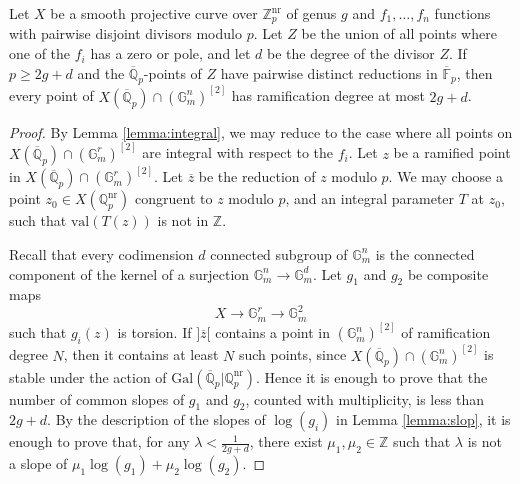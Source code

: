 \documentclass[10pt,a4paper]{amsart}
\def\Q{\mathbb Q}
\def\Z{\mathbb Z}
\newcommand{\F}{\mathbb{F}}
\newcommand{\Gal}{\mathrm{Gal}}
\newcommand{\nr}{\mathrm{nr}}
\newcommand{\val}{\mathrm{val}}
\begin{document}
\begin{proposition}\label{prop:ram}
Let $X$ be a smooth projective curve over $\Z _p ^{\nr }$ of genus $g$ and $f_1 ,\ldots ,f_n$ functions with pairwise disjoint divisors modulo $p$. Let $Z$ be the union of all points where one of the $f_i$ has a zero or pole, and let $d$ be the degree of the divisor $Z$. If $p\geq 2g+d$ and the $\overline{\Q }_p $-points of $Z$ have pairwise distinct reductions in $\overline{\F }_p$, then every point of $X(\overline{\Q }_p )\cap (\mathbb{G}_m ^{n})^{[2]}$ has ramification degree at most $2g+d$.
\end{proposition}

\begin{proof}
By Lemma \ref{lemma:integral}, we may reduce to the case where all points on $X(\overline {\Q }_p )\cap (\mathbb{G}_m ^{r})^{[2]}$ are integral with respect to the $f_i$. Let $z$ be a ramified point in $X(\overline{\Q }_p )\cap (\mathbb{G}_m ^r )^{[2]}$. Let $\overline{z}$ be the reduction of $z$ modulo $p$. We may choose a point $z_0 \in X(\Q _p ^{\mathrm{nr}})$ congruent to $z$ modulo $p$, and an integral parameter $T$ at $z_0$, such that $\val (T(z))$ is not in $\Z $.

Recall that every codimension $d$ connected subgroup of $\mathbb{G}_m ^n $ is the connected component of the kernel of a surjection $\mathbb{G}_m ^n \to \mathbb{G}_m ^d $. Let $g_1 $ and $g_2 $ be composite maps
\[
X\to \mathbb{G}_m ^r \to \mathbb{G}_m ^2
\]
such that $g_i (z)$ is torsion. If $]\overline{z}[$ contains a point in $(\mathbb{G}_m ^n )^{[2]}$ of ramification degree $N$, then it contains at least $N$ such points, since $X(\overline{\Q }_p )\cap (\mathbb{G}_m ^n )^{[2]}$ is stable under the action of $\Gal (\overline{\Q }_p |\Q _p ^{\nr})$. Hence it is enough to prove that the number of common slopes of $g_1 $ and $g_2$, counted with multiplicity, is less than $2g+d$. By the description of the slopes of $\log (g_i )$ in Lemma \ref{lemma:slop}, it is enough to prove that, for any $\lambda <\frac{1}{2g+d}$, there exist $\mu _1 ,\mu _2 \in \Z$ such that $\lambda $ is not a slope of $\mu _1 \log (g_1 )+\mu _2 \log (g_2 )$.


\end{proof}
\end{document}
